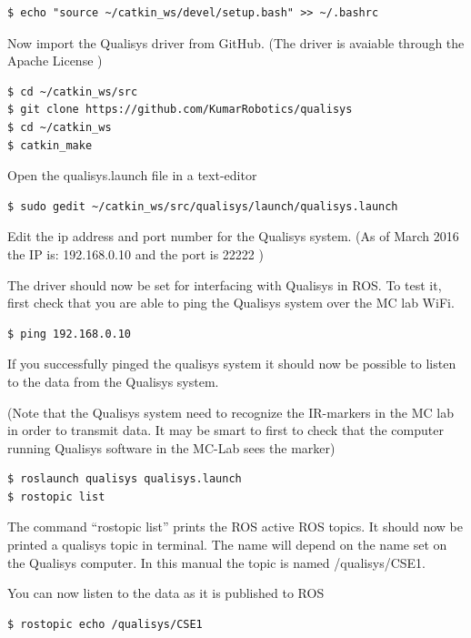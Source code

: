 \documentclass[a4paper,english]{report}
\begin{document}
\begin{verbatim}$ echo "source ~/catkin_ws/devel/setup.bash" >> ~/.bashrc\end{verbatim}

Now import the Qualisys driver from GitHub. (The driver \citep{KumarRobotics2016} is avaiable through the Apache License )

\begin{verbatim}$ cd ~/catkin_ws/src
$ git clone https://github.com/KumarRobotics/qualisys
$ cd ~/catkin_ws
$ catkin_make\end{verbatim}

Open the qualisys.launch file in a text-editor

\begin{verbatim}$ sudo gedit ~/catkin_ws/src/qualisys/launch/qualisys.launch\end{verbatim}

Edit the ip address and port number for the Qualisys system. (As of March 2016 the IP is: 192.168.0.10 and the port is 22222 )

The driver should now be set for interfacing with Qualisys in ROS. To test it, first check that you are able to ping the Qualisys system over the MC lab WiFi.

\begin{verbatim}$ ping 192.168.0.10\end{verbatim}

If you successfully pinged the qualisys system it should now be possible to listen to the data from the Qualisys system.

(Note that the Qualisys system need to recognize the IR-markers in the MC lab in order to transmit data. It may be smart to first to check that the computer running Qualisys software in the MC-Lab sees the marker)

\begin{verbatim}$ roslaunch qualisys qualisys.launch
$ rostopic list\end{verbatim}

The command ``rostopic list'' prints the ROS active ROS topics. It should now be printed a qualisys topic in terminal. The name will depend on the name set on the Qualisys computer. In this manual the topic is named /qualisys/CSE1.

You can now listen to the data as it is published to ROS

\begin{verbatim}$ rostopic echo /qualisys/CSE1\end{verbatim}
\end{document}
